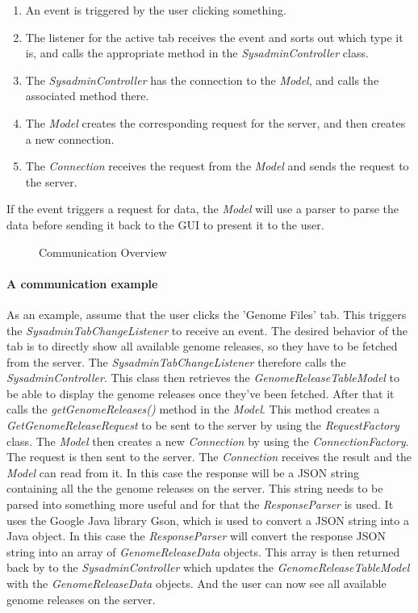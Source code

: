 \begin{enumerate}
  \item An event is triggered by the user clicking something.
  \item The listener for the active tab receives the event and sorts out which type it is, and calls the appropriate method in the \textit{SysadminController} class.
  \item The \textit{SysadminController} has the connection to the \textit{Model}, and calls the associated method there.
  \item The \textit{Model} creates the corresponding request for the server, and then creates a new connection.
  \item The \textit{Connection} receives the request from the \textit{Model} and sends the request to the server.
\end{enumerate}

If the event triggers a request for data, the \textit{Model} will use a parser to parse the data before sending it back to the GUI to present it to the user.


\begin{figure}[hbt!]
\caption{Communication Overview}
\label{fig:adm_com_view}
\end{figure}


\paragraph{A communication example}
\label{Communication example}

As an example, assume that the user clicks the 'Genome Files' tab.
This triggers the \textit{SysadminTabChangeListener} to receive an event. The desired behavior of the tab is to directly show all available genome releases, so they  have to be fetched from the server. The \textit{SysadminTabChangeListener} therefore calls the \textit{SysadminController}.
This class then retrieves the \textit{GenomeReleaseTableModel} to be able to display the genome releases once they've been fetched.  After that it calls the \textit{getGenomeReleases()} method in the \textit{Model}. This method creates a \textit{GetGenomeReleaseRequest} to be sent to the server by using the \textit{RequestFactory} class. The \textit{Model} then creates a new \textit{Connection} by using the \textit{ConnectionFactory}. The request is then sent to the server. The \textit{Connection} receives the result and the \textit{Model} can read from it. In this case the response will be a JSON string containing all the the genome releases on the server. This string needs to be parsed into something more useful and for that the \textit{ResponseParser} is used. It uses the Google Java library Gson, which is used to convert a JSON string into a Java object. In this case the \textit{ResponseParser} will convert the response JSON string into an array of \textit{GenomeReleaseData} objects. This array is then returned back by to the \textit{SysadminController} which updates the \textit{GenomeReleaseTableModel} with the \textit{GenomeReleaseData} objects. And the user can now see all available genome releases on the server.

